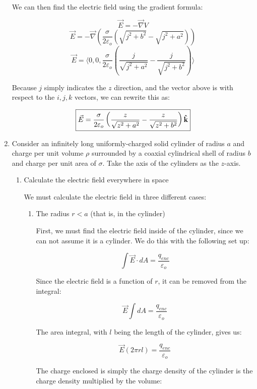 \begin{enumerate}
    We can then find the electric field using the gradient formula:

    $$\vec{E}=-\vec{\nabla}V$$
    $$\vec{E}=-\vec{\nabla}\left(  \frac{\sigma}{2\varepsilon_o}\left(  \sqrt{j^2+b^2}-\sqrt{j^2+a^2}\right) \right)$$
    $$\boxed{\vec{E}=\langle 0, 0, \frac{\sigma}{2\varepsilon_o}\left( \frac{j}{\sqrt{j^2+a^2}}-\frac{j}{\sqrt{j^2+b^2}} \right)\rangle}$$

    Because $j$ simply indicates the $z$ direction, and the vector above is with respect to the $i,j,k$ vectors, we can rewrite this as:

    $$\boxed{\vec{E}=\frac{\sigma}{2\varepsilon_o}\left( \frac{z}{\sqrt{z^2+a^2}}-\frac{z}{\sqrt{z^2+b^2}} \right)\bold{\hat{k}}}$$
    
  \item Consider an infinitely long uniformly-charged solid cylinder of radius $a$ and charge per unit volume $\rho$ surrounded by a coaxial cylindrical shell of radius $b$ and charge per unit area of $\sigma$. Take the axis of the cylinders as the $z$-axis.

    \begin{enumerate}

      \item Calculate the electric field everywhere in space

        We must calculate the electric field in three different cases:

        \begin{enumerate}

          \item The radius $r<a$ (that is, in the cylinder)

            First, we must find the electric field inside of the cylinder, since we can not assume it is a cylinder. We do this with the following set up:

            $$\int \vec{E}\cdot dA=\frac{q_{enc}}{\varepsilon_o}$$

            Since the electric field is a function of $r$, it can be removed from the integral:

            $$\vec{E}\int dA=\frac{q_{enc}}{\varepsilon_o}$$

            The area integral, with $l$ being the length of the cylinder, gives us:

            $$\vec{E}(2\pi rl)=\frac{q_{enc}}{\varepsilon_o}$$

            The charge enclosed is simply the charge density of the cylinder is the charge density multiplied by the volume:


\end{enumerate}
\end{enumerate}
\end{enumerate}

